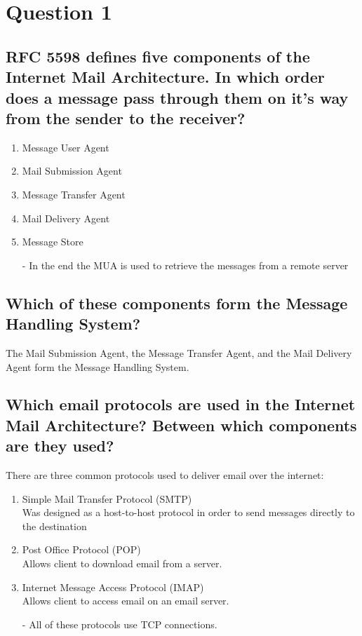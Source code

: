 \documentclass{report}
\begin{document}
	\section{Question 1}
	\startsection
		\renewcommand{\thesubsection}{\thesection.\Alph{subsection}}
		\subsection{RFC 5598 defines five components of the Internet Mail Architecture. In which order does a message pass through them on it's way from the sender to the receiver?}
		\begin{enumerate}
			\item Message User Agent
			\item Mail Submission Agent
			\item Message Transfer Agent
			\item Mail Delivery Agent
			\item Message Store
			\item[-] In the end the MUA is used to retrieve the messages from a remote server
		\end{enumerate}
		\subsection{Which of these components form the Message Handling System?}
		\startsubsection
			The Mail Submission Agent, the Message Transfer Agent, and the Mail Delivery Agent form the Message Handling System.
		\closesection
		\subsection{Which email protocols are used in the Internet Mail Architecture? Between which components are they used?}
		\startsubsection
			There are three common protocols used to deliver email over the internet:
			\begin{enumerate}
				\item Simple Mail Transfer Protocol (SMTP) \\
				Was designed as a host-to-host protocol in order to send messages directly to the destination
				\item Post Office Protocol (POP) \\
				Allows client to download email from a server.
				\item Internet Message Access Protocol (IMAP) \\
				Allows client to access email on an email server.
				\item[-] All of these protocols use TCP connections.
			\end{enumerate}
		\closesection
	\closesection
\end{document}
